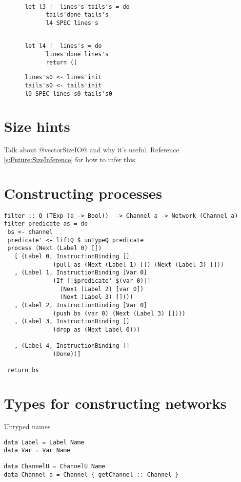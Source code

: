 \begin{lstlisting}

      let l3 !_ lines's tails's = do
            tails'done tails's
            l4 SPEC lines's
\end{lstlisting}

\begin{lstlisting}

      let l4 !_ lines's = do
            lines'done lines's
            return ()
\end{lstlisting}

\begin{lstlisting}
      lines's0 <- lines'init
      tails's0 <- tails'init
      l0 SPEC lines's0 tails's0
\end{lstlisting}

\section{Size hints}
\label{s:implementation:sizehints}
Talk about @vectorSizeIO@ and why it's useful.
Reference \autoref{s:Future:SizeInference} for how to infer this.

\section{Constructing processes}
\begin{lstlisting}
filter :: Q (TExp (a -> Bool))  -> Channel a -> Network (Channel a)
filter predicate as = do
 bs <- channel
 predicate' <- liftQ $ unTypeQ predicate
 process (Next (Label 0) [])
   [ (Label 0, InstructionBinding []
              (pull as (Next (Label 1) []) (Next (Label 3) []))
   , (Label 1, InstructionBinding [Var 0]
              (If [|$predicate' $(var 0)|]
                (Next (Label 2) [var 0])
                (Next (Label 3) [])))
   , (Label 2, InstructionBinding [Var 0]
              (push bs (var 0) (Next (Label 3) [])))
   , (Label 3, InstructionBinding []
              (drop as (Next Label 0)))

   , (Label 4, InstructionBinding []
              (Done))]

 return bs
\end{lstlisting}

\section{Types for constructing networks}

Untyped names
\begin{lstlisting}
data Label = Label Name
data Var = Var Name

data ChannelU = ChannelU Name
data Channel a = Channel { getChannel :: Channel }
\end{lstlisting}


